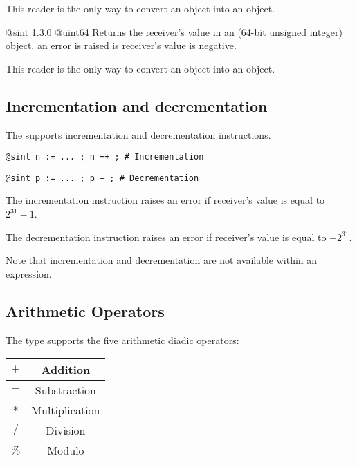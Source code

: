 This reader is the only way to convert an  object into an  object.




{@sint}
{1.3.0}
{@uint64}
{Returns the receiver's value in an  (64-bit unsigned integer) object.}
{an error is raised is receiver's value is negative.}

This reader is the only way to convert an  object into an  object.





\subsection{Incrementation and decrementation}

The  supports incrementation and decrementation instructions.

\texttt{@sint n := ... ; n ++ ; \# Incrementation}

\texttt{@sint p := ... ; p -- ; \# Decrementation}\newline

The incrementation instruction raises an error if receiver's value is equal to $2^{31}-1$.\newline

The decrementation instruction raises an error if receiver's value is equal to $-2^{31}$.\newline

Note that incrementation and decrementation are not available within an expression.




\subsection{Arithmetic Operators}

The  type supports the five arithmetic diadic operators:\newline

\begin{tabular}{|c|c|}
\hline
$+$ & Addition \\
\hline
$-$ & Substraction \\
\hline
$*$ & Multiplication \\
\hline
$/$ & Division \\
\hline
$\%$ & Modulo \\
\hline
\end{tabular}\newline


